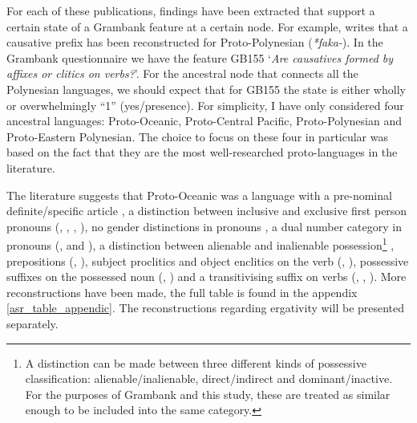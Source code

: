 \documentclass[draft,10pt]{article} %
\begin{document}
For each of these publications, findings have been extracted that support a certain state of a Grambank feature at a certain node. For example, \citet[4]{marck2000_encyclo} writes that a causative prefix has been reconstructed for Proto-Polynesian (\emph{*faka-}). In the Grambank questionnaire we have the feature GB155 `\emph{Are causatives formed by affixes or clitics on verbs?}'. For the ancestral node that connects all the Polynesian languages, we should expect that for GB155 the state is either wholly or overwhelmingly ``1'' (yes/presence). For simplicity, I have only considered four ancestral languages: Proto-Oceanic, Proto-Central Pacific, Proto-Polynesian and Proto-Eastern Polynesian. The choice to focus on these four in particular was based on the fact that they are the most well-researched proto-languages in the literature. 


The literature suggests that Proto-Oceanic was a language with a pre-nominal definite/specific article \citep[136]{crowley1985common}, a distinction between inclusive and exclusive first person pronouns (\citet[112]{pawley1973some}, \citet[184]{crowley1985common}, \citet[500]{ross2004morphosyntactic}, \citet[67, 75]{lynchrosscrowley_proto_grammar_oceanic}), no gender distinctions in pronouns \citep[498]{ross2004morphosyntactic}, a dual number category in pronouns (\citet[498]{ross2004morphosyntactic}, \citet[69]{lynchrosscrowley_proto_grammar_oceanic} and \citet[173]{pawley1973some}), a distinction between alienable and inalienable possession\footnote{A distinction can be made between three different kinds of possessive classification: alienable/inalienable, direct/indirect and dominant/inactive. For the purposes of Grambank and this study, these are treated as similar enough to be included into the same category.} \citep[69]{lynchrosscrowley_proto_grammar_oceanic}, prepositions (\citet[167]{pawley1973some}, \citet[498]{ross2004morphosyntactic}), subject proclitics and object enclitics on the verb (\citet[498-499]{ross2004morphosyntactic}, \citet[83]{lynchrosscrowley_proto_grammar_oceanic}), possessive suffixes on the possessed noun (\citet[495]{ross2004morphosyntactic}, \citet[155]{pawley1973some}) and a transitivising suffix on verbs (\citet[352]{pawley1970change}, \citet[171]{pawley1973some}, \citet[80, 92]{lynchrosscrowley_proto_grammar_oceanic}). More reconstructions have been made, the full table is found in the appendix \ref{asr_table_appendic}. The reconstructions regarding ergativity will be presented separately.
\end{document}
